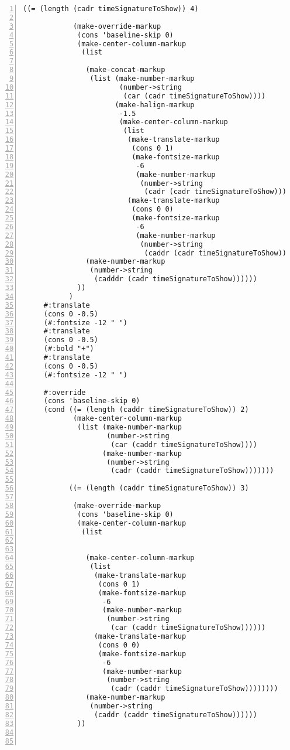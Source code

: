 \begin{Verbatim}[numbers=left,xleftmargin=5mm]
           ((= (length (cadr timeSignatureToShow)) 4)

            (make-override-markup
             (cons 'baseline-skip 0)
             (make-center-column-markup
              (list

               (make-concat-markup
                (list (make-number-markup
                       (number->string
                        (car (cadr timeSignatureToShow))))
                      (make-halign-markup
                       -1.5
                       (make-center-column-markup
                        (list
                         (make-translate-markup
                          (cons 0 1)
                          (make-fontsize-markup
                           -6
                           (make-number-markup
                            (number->string
                             (cadr (cadr timeSignatureToShow))))))
                         (make-translate-markup
                          (cons 0 0)
                          (make-fontsize-markup
                           -6
                           (make-number-markup
                            (number->string
                             (caddr (cadr timeSignatureToShow)))))))))))
               (make-number-markup
                (number->string
                 (cadddr (cadr timeSignatureToShow))))))
             ))
           )
     #:translate
     (cons 0 -0.5)
     (#:fontsize -12 " ")
     #:translate
     (cons 0 -0.5)
     (#:bold "+")
     #:translate
     (cons 0 -0.5)
     (#:fontsize -12 " ")

     #:override
     (cons 'baseline-skip 0)
     (cond ((= (length (caddr timeSignatureToShow)) 2)
            (make-center-column-markup
             (list (make-number-markup
                    (number->string
                     (car (caddr timeSignatureToShow))))
                   (make-number-markup
                    (number->string
                     (cadr (caddr timeSignatureToShow)))))))

           ((= (length (caddr timeSignatureToShow)) 3)

            (make-override-markup
             (cons 'baseline-skip 0)
             (make-center-column-markup
              (list


               (make-center-column-markup
                (list
                 (make-translate-markup
                  (cons 0 1)
                  (make-fontsize-markup
                   -6
                   (make-number-markup
                    (number->string
                     (car (caddr timeSignatureToShow))))))
                 (make-translate-markup
                  (cons 0 0)
                  (make-fontsize-markup
                   -6
                   (make-number-markup
                    (number->string
                     (cadr (caddr timeSignatureToShow))))))))
               (make-number-markup
                (number->string
                 (caddr (caddr timeSignatureToShow))))))
             ))



\end{Verbatim}
